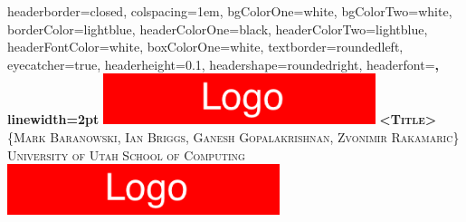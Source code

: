 \documentclass[landscape,a0paper,fontscale=0.285]{baposter} %
\begin{document}
\begin{poster}
{
headerborder=closed, %
colspacing=1em, %
bgColorOne=white, %
bgColorTwo=white, %
borderColor=lightblue, %
headerColorOne=black, %
headerColorTwo=lightblue, %
headerFontColor=white, %
boxColorOne=white, %
textborder=roundedleft,
eyecatcher=true, %
headerheight=0.1\textheight, %
headershape=roundedright,
headerfont=\Large\bf\textsc, %
linewidth=2pt %
}
{\includegraphics[height=4em]{left_logo}} %
{\bf\textsc{<Title>}\vspace{0.5em}} %
{\textsc{ {\large \{Mark Baranowski, Ian Briggs, Ganesh Gopalakrishnan, Zvonimir Rakamaric\}}
    \hspace{12pt} University of Utah School of Computing}} %
{\includegraphics[height=4em]{right_logo}} %












\end{poster}
\end{document}
